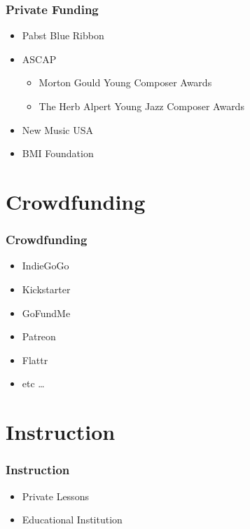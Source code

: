 \documentclass[xetex,14pt]{beamer}
\begin{document}
\begin{frame}
  \frametitle{Private Funding}
  \begin{itemize}
  \item Pabst Blue Ribbon
  \item ASCAP
    \begin{itemize}
    \item<2-> Morton Gould Young Composer Awards
    \item<2-> The Herb Alpert Young Jazz Composer Awards
    \end{itemize}
  \item<3-> New Music USA
  \item<3-> BMI Foundation

  \end{itemize}
\end{frame}

\section{Crowdfunding}
\begin{frame}
  \frametitle{Crowdfunding}
  \begin{itemize}
  \item IndieGoGo
  \item Kickstarter
  \item GoFundMe
  \item Patreon
  \item Flattr
  \item etc \ldots
  \end{itemize}
\end{frame}

\section{Instruction}

\begin{frame}
  \frametitle{Instruction}
  \begin{itemize}
  \item Private Lessons
  \item Educational Institution
  \end{itemize}
\end{frame}
\end{document}

